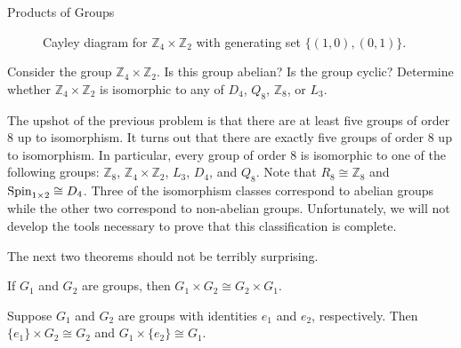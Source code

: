 \begin{section}{Products of Groups}
\begin{figure}[!ht]
\centering
{}
\caption{Cayley diagram for $\mathbb{Z}_4 \times \mathbb{Z}_2$ with generating set $\{(1,0),(0,1)\}$.}\label{fig:Cayley_Z4xZ2}
\end{figure}

\begin{problem}
Consider the group $\mathbb{Z}_4 \times \mathbb{Z}_2$.  Is this group abelian?  Is the group cyclic?  Determine whether $\mathbb{Z}_4 \times \mathbb{Z}_2$ is isomorphic to any of $D_4$, $Q_8$, $\mathbb{Z}_8$, or $L_3$.
\end{problem}

The upshot of the previous problem is that there are at least five groups of order 8 up to isomorphism.  It turns out that there are exactly five groups of order 8 up to isomorphism.  In particular, every group of order 8 is isomorphic to one of the following groups: $\mathbb{Z}_8$, $\mathbb{Z}_4 \times \mathbb{Z}_2$, $L_3$, $D_4$, and $Q_8$. Note that $R_8\cong \mathbb{Z}_8$ and $\operatorname{Spin}_{1\times 2}\cong D_4$. Three of the isomorphism classes correspond to abelian groups while the other two correspond to non-abelian groups.  Unfortunately, we will not develop the tools necessary to prove that this classification is complete.

The next two theorems should not be terribly surprising.

\begin{theorem}
If $G_1$ and $G_2$ are groups, then $G_1\times G_2\cong G_2\times G_1$.
\end{theorem}

\begin{theorem}
Suppose $G_1$ and $G_2$ are groups with identities $e_1$ and $e_2$, respectively.  Then $\{e_1\}\times G_2\cong G_2$ and $G_1\times \{e_2\}\cong G_1$.
\end{theorem}


\end{section}
